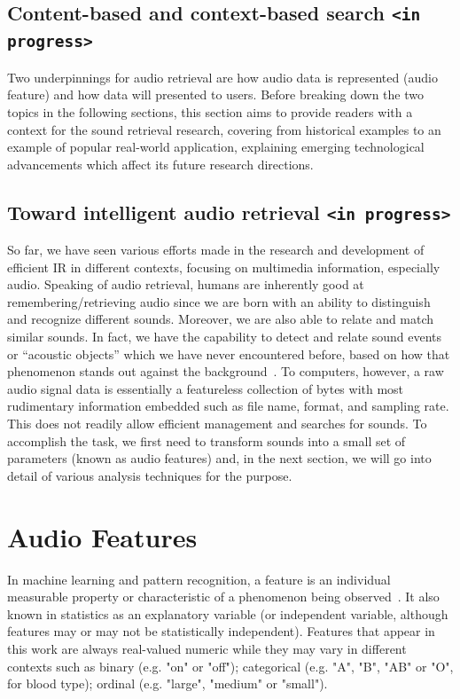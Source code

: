 \subsection{Content-based and context-based search \texttt{<in progress>}}

Two underpinnings for audio retrieval are how audio data is represented (audio feature) and how data will presented to users. Before breaking down the two topics in the following sections, this section aims to provide readers with a context for the sound retrieval research, covering from historical examples to an example of popular real-world application, explaining emerging technological advancements which affect its future research directions.

\subsection{Toward intelligent audio retrieval \texttt{<in progress>}}
So far, we have seen various efforts made in the research and development of efficient IR in different contexts, focusing on multimedia information, especially audio. Speaking of audio retrieval, humans are inherently good at remembering/retrieving audio since we are born with an ability to distinguish and recognize different sounds. Moreover, we are also able to relate and match similar sounds. In fact, we have the capability to detect and relate sound events or “acoustic objects” which we have never encountered before, based on how that phenomenon stands out against the background~\cite{kumar2014}. To computers, however, a raw audio signal data is essentially a featureless collection of bytes with most rudimentary information embedded such as file name, format, and sampling rate. This does not readily allow efficient management and searches for sounds. To accomplish the task, we first need to transform sounds into a small set of parameters (known as audio features) and, in the next section, we will go into detail of various analysis techniques for the purpose. 

\section{Audio Features} 
In machine learning and pattern recognition, a feature is an individual measurable property or characteristic of a phenomenon being observed~\cite{bishop2006}. It also known in statistics as an explanatory variable (or independent variable, although features may or may not be statistically independent). Features that appear in this work are always real-valued numeric while they may vary in different contexts such as binary (e.g. "on" or "off"); categorical (e.g. "A", "B", "AB" or "O", for blood type); ordinal (e.g. "large", "medium" or "small").

